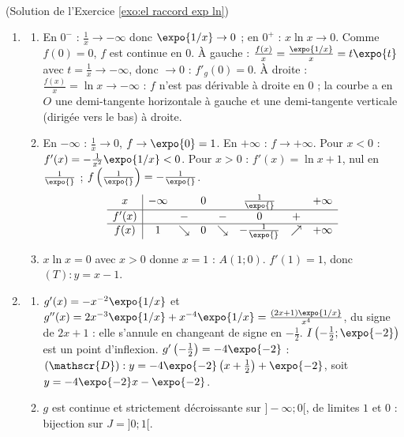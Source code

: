 \begin{corrige}
\begin{sol} ~ \\
(Solution de l'Exercice \ref{exo:el raccord exp ln})
\begin{enumerate}
\item \begin{enumerate}
      \item En $0^-$ : $\frac{1}{x} \to -\infty$ donc $\expo{1/x} \to 0$ ; en $0^+$ : $x\ln x \to 0$. Comme $f(0) = 0$, $f$ est continue en $0$.
            \`A gauche : $\frac{f(x)}{x} = \frac{\expo{1/x}}{x} = t\expo{t}$ avec $t = \frac{1}{x} \to -\infty$, donc $\to 0$ : $f'_g(0) = 0$.
            \`A droite : $\frac{f(x)}{x} = \ln x \to -\infty$ : $f$ n'est pas d\'erivable \`a droite en $0$ ; la courbe a en $O$ une demi-tangente
            horizontale \`a gauche et une demi-tangente verticale (dirig\'ee vers le bas) \`a droite.
      \item En $-\infty$ : $\frac{1}{x} \to 0$, $f \to \expo{0} = 1$. En $+\infty$ : $f \to +\infty$.
            Pour $x < 0$ : $f'(x) = -\frac{1}{x^2}\expo{1/x} < 0$. Pour $x > 0$ : $f'(x) = \ln x + 1$, nul en $\frac{1}{\expo{}}$ ; $f\left(\frac{1}{\expo{}}\right) = -\frac{1}{\expo{}}$.
            \[
            \begin{array}{c|ccccccc}
            x & -\infty & & 0 & & \frac{1}{\expo{}} & & +\infty \\ \hline
            f'(x) & & - & & - & 0 & + & \\ \hline
            f(x) & 1 & \searrow & 0 & \searrow & -\frac{1}{\expo{}} & \nearrow & +\infty
            \end{array}
            \]
      \item $x\ln x = 0$ avec $x > 0$ donne $x = 1$ : $A(1;0)$. $f'(1) = 1$, donc $(T) : y = x - 1$.
      \end{enumerate}
\item \begin{enumerate}
      \item $g'(x) = -x^{-2}\expo{1/x}$ et $g''(x) = 2x^{-3}\expo{1/x} + x^{-4}\expo{1/x} = \frac{(2x + 1)\expo{1/x}}{x^4}$,
            du signe de $2x + 1$ : elle s'annule en changeant de signe en $-\frac{1}{2}$. $I\left(-\frac{1}{2};\expo{-2}\right)$ est un point d'inflexion.
            $g'\left(-\frac{1}{2}\right) = -4\expo{-2}$ : $(\mathscr{D}) : y = -4\expo{-2}\left(x + \frac{1}{2}\right) + \expo{-2}$, soit $y = -4\expo{-2}x - \expo{-2}$.
      \item $g$ est continue et strictement d\'ecroissante sur $]-\infty;0[$, de limites $1$ et $0$ : bijection sur $J = ]0;1[$.

\end{enumerate}
\end{enumerate}
\end{sol}
\end{corrige}
